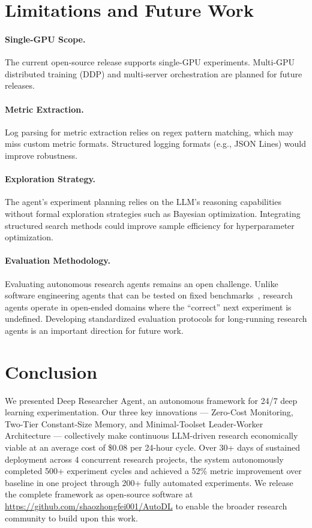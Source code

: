 \section{Limitations and Future Work}
\label{sec:limitations}

\paragraph{Single-GPU Scope.} The current open-source release supports single-GPU experiments. Multi-GPU distributed training (DDP) and multi-server orchestration are planned for future releases.

\paragraph{Metric Extraction.} Log parsing for metric extraction relies on regex pattern matching, which may miss custom metric formats. Structured logging formats (e.g., JSON Lines) would improve robustness.

\paragraph{Exploration Strategy.} The agent's experiment planning relies on the LLM's reasoning capabilities without formal exploration strategies such as Bayesian optimization. Integrating structured search methods could improve sample efficiency for hyperparameter optimization.

\paragraph{Evaluation Methodology.} Evaluating autonomous research agents remains an open challenge. Unlike software engineering agents that can be tested on fixed benchmarks~\cite{swe-agent}, research agents operate in open-ended domains where the ``correct'' next experiment is undefined. Developing standardized evaluation protocols for long-running research agents is an important direction for future work.

\section{Conclusion}
\label{sec:conclusion}

We presented Deep Researcher Agent, an autonomous framework for 24/7 deep learning experimentation. Our three key innovations --- Zero-Cost Monitoring, Two-Tier Constant-Size Memory, and Minimal-Toolset Leader-Worker Architecture --- collectively make continuous LLM-driven research economically viable at an average cost of \$0.08 per 24-hour cycle. Over 30+ days of sustained deployment across 4 concurrent research projects, the system autonomously completed 500+ experiment cycles and achieved a 52\% metric improvement over baseline in one project through 200+ fully automated experiments. We release the complete framework as open-source software at \url{https://github.com/shaozhongfei001/AutoDL} to enable the broader research community to build upon this work.
